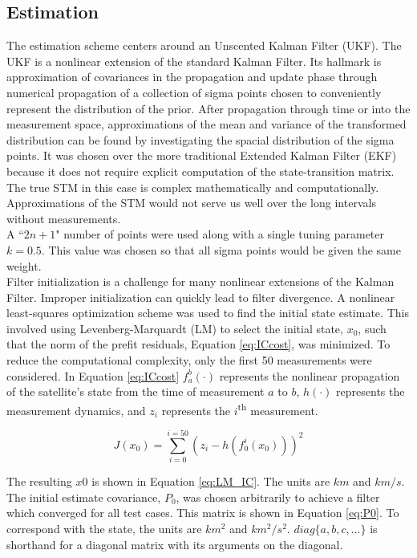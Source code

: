 \documentclass[11pt]{article}
\begin{document}
\subsection{Estimation}

The estimation scheme centers around an Unscented Kalman Filter (UKF). The UKF is a nonlinear extension of the standard Kalman Filter. Its hallmark is approximation of covariances in the propagation and update phase through numerical propagation of a collection of sigma points chosen to conveniently represent the distribution of the prior. After propagation through time or into the measurement space, approximations of the mean and variance of the transformed distribution can be found by investigating the spacial distribution of the sigma points. It was chosen over the more traditional Extended Kalman Filter (EKF) because it does not require explicit computation of the state-transition matrix. The true STM in this case is complex mathematically and computationally. Approximations of the STM would not serve us well over the long intervals without measurements. \\

A ``$2n+1$" number of points were used along with a single tuning parameter $k=0.5$. This value was chosen so that all sigma points would be given the same weight. \\

Filter initialization is a challenge for many nonlinear extensions of the Kalman Filter. Improper initialization can quickly lead to filter divergence. A nonlinear least-squares optimization scheme was used to find the initial state estimate. This involved using Levenberg-Marquardt (LM) to select the initial state, $x_0$, such that the norm of the prefit residuals, Equation \eqref{eq:ICcost}, was minimized. To reduce the computational complexity, only the first 50 measurements were considered. In Equation \eqref{eq:ICcost} $f_a^b(\cdot)$ represents the nonlinear propagation of the satellite's state from the time of measurement $a$ to $b$, $h(\cdot)$ represents the measurement dynamics, and $z_i$ represents the $i$\textsuperscript{th} measurement. 

\begin{equation}
	\label{eq:ICcost}
	J(x_0) = \sum_{i=0}^{i=50} \left( z_i - h(f_{0}^{i}(x_0)) \right)^2 
\end{equation}

The resulting $x0$ is shown in Equation \eqref{eq:LM_IC}. The units are $km$ and $km/s$. The initial estimate covariance, $P_0$, was chosen arbitrarily to achieve a filter which converged for all test cases. This matrix is shown in Equation \eqref{eq:P0}. To correspond with the state, the units are $km^2$ and $km^2/s^2$. $diag \{a, b, c, ... \}$ is shorthand for a diagonal matrix with its arguments on the diagonal.
\end{document}
